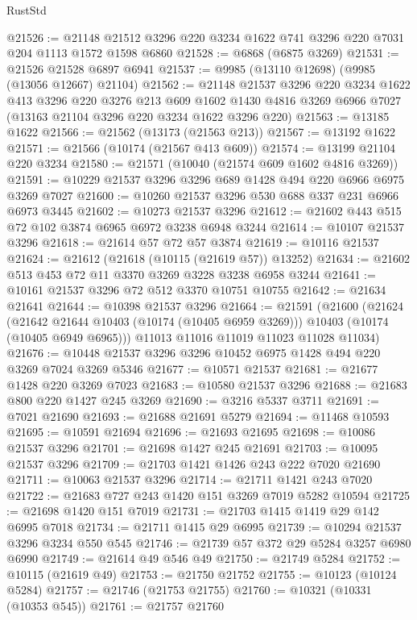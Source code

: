 \begin{lexlean}{RustStd}
\begin{coremodule}
@21526 := @21148 @21512 @3296 @220 @3234 @1622 @741 @3296 @220 @7031 @204 @1113 @1572 @1598 @6860
@21528 := @6868 (@6875 @3269)
@21531 := @21526 @21528 @6897 @6941
@21537 := @9985 (@13110 @12698) (@9985 (@13056 @12667) @21104)
@21562 := @21148
    @21537
    @3296
    @220
    @3234
    @1622
    @413
    @3296
    @220
    @3276
    @213
    @609
    @1602
    @1430
    @4816
    @3269
    @6966
    @7027
    (@13163 @21104 @3296 @220 @3234 @1622 @3296 @220)
@21563 := @13185 @1622
@21566 := @21562 (@13173 (@21563 @213))
@21567 := @13192 @1622
@21571 := @21566 (@10174 (@21567 @413 @609))
@21574 := @13199 @21104 @220 @3234
@21580 := @21571 (@10040 (@21574 @609 @1602 @4816 @3269))
@21591 := @10229 @21537 @3296 @3296 @689 @1428 @494 @220 @6966 @6975 @3269 @7027
@21600 := @10260 @21537 @3296 @530 @688 @337 @231 @6966 @6973 @3445
@21602 := @10273 @21537 @3296
@21612 := @21602 @443 @515 @72 @102 @3874 @6965 @6972 @3238 @6948 @3244
@21614 := @10107 @21537 @3296
@21618 := @21614 @57 @72 @57 @3874
@21619 := @10116 @21537
@21624 := @21612 (@21618 (@10115 (@21619 @57)) @13252)
@21634 := @21602 @513 @453 @72 @11 @3370 @3269 @3228 @3238 @6958 @3244
@21641 := @10161 @21537 @3296 @72 @512 @3370 @10751 @10755
@21642 := @21634 @21641
@21644 := @10398 @21537 @3296
@21664 := @21591
    (@21600
      (@21624
        (@21642 @21644 @10403 (@10174 (@10405 @6959 @3269)))
        @10403
        (@10174 (@10405 @6949 @6965)))
      @11013
      @11016
      @11019
      @11023
      @11028
      @11034)
@21676 := @10448 @21537 @3296 @3296 @10452 @6975 @1428 @494 @220 @3269 @7024 @3269 @5346
@21677 := @10571 @21537
@21681 := @21677 @1428 @220 @3269 @7023
@21683 := @10580 @21537 @3296
@21688 := @21683 @800 @220 @1427 @245 @3269
@21690 := @3216 @5337 @3711
@21691 := @7021 @21690
@21693 := @21688 @21691 @5279
@21694 := @11468 @10593
@21695 := @10591 @21694
@21696 := @21693 @21695
@21698 := @10086 @21537 @3296
@21701 := @21698 @1427 @245 @21691
@21703 := @10095 @21537 @3296
@21709 := @21703 @1421 @1426 @243 @222 @7020 @21690
@21711 := @10063 @21537 @3296
@21714 := @21711 @1421 @243 @7020
@21722 := @21683 @727 @243 @1420 @151 @3269 @7019 @5282 @10594
@21725 := @21698 @1420 @151 @7019
@21731 := @21703 @1415 @1419 @29 @142 @6995 @7018
@21734 := @21711 @1415 @29 @6995
@21739 := @10294 @21537 @3296 @3234 @550 @545
@21746 := @21739 @57 @372 @29 @5284 @3257 @6980 @6990
@21749 := @21614 @49 @546 @49
@21750 := @21749 @5284
@21752 := @10115 (@21619 @49)
@21753 := @21750 @21752
@21755 := @10123 (@10124 @5284)
@21757 := @21746 (@21753 @21755)
@21760 := @10321 (@10331 (@10353 @545))
@21761 := @21757 @21760

\end{coremodule}
\end{lexlean}

